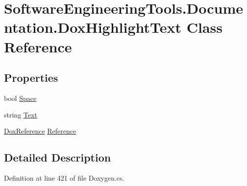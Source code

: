 \hypertarget{class_software_engineering_tools_1_1_documentation_1_1_dox_highlight_text}{\section{Software\+Engineering\+Tools.\+Documentation.\+Dox\+Highlight\+Text Class Reference}
\label{class_software_engineering_tools_1_1_documentation_1_1_dox_highlight_text}
}
\subsection*{Properties}
\begin{DoxyCompactItemize}
\item 
bool \hyperlink{class_software_engineering_tools_1_1_documentation_1_1_dox_highlight_text_abb881a24f22da09b0445870ae92f5705}{Space}
\item 
string \hyperlink{class_software_engineering_tools_1_1_documentation_1_1_dox_highlight_text_ad242ac8b899f16d9562e4b3cf0d4ae89}{Text}
\item 
\hyperlink{class_software_engineering_tools_1_1_documentation_1_1_dox_reference}{Dox\+Reference} \hyperlink{class_software_engineering_tools_1_1_documentation_1_1_dox_highlight_text_aeb0aa6b4874d74f6b8e23ceaef539539}{Reference}
\end{DoxyCompactItemize}


\subsection{Detailed Description}


Definition at line 421 of file Doxygen.\+cs.



